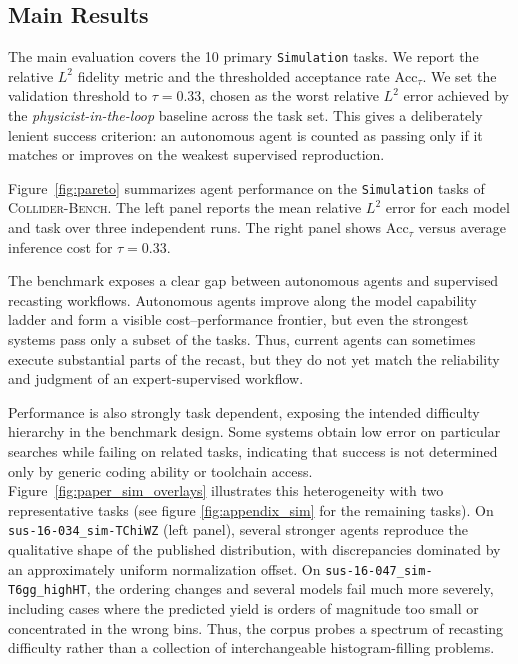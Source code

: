 \documentclass{article}
\newcommand{\ColliderBench}{\textsc{Collider-Bench}}
\begin{document}
\subsection{Main Results}
\label{sec:main-results}
The main evaluation covers the 10 primary \texttt{Simulation} tasks. We report the relative \(L^2\) fidelity metric and the thresholded acceptance rate \(\mathrm{Acc}_{\tau}\).%
We set the validation threshold to \(\tau=0.33\), chosen as the worst relative \(L^2\) error achieved by the {\it physicist-in-the-loop} baseline across the task set. This gives a deliberately lenient success criterion: an autonomous agent is counted as passing only if it matches or improves on the weakest supervised reproduction.

Figure~\ref{fig:pareto} summarizes agent performance on the \texttt{Simulation} tasks of \ColliderBench{}. The left panel reports the mean relative \(L^2\) error for each model and task over three independent runs. The right panel shows \(\mathrm{Acc}_{\tau}\) versus average inference cost for \(\tau=0.33\).

The benchmark exposes a clear gap between autonomous agents and supervised recasting workflows. Autonomous agents improve along the model capability ladder and form a visible cost--performance frontier, but even the strongest systems pass only a subset of the tasks. Thus, current agents can sometimes execute substantial parts of the recast, but they do not yet match the reliability and judgment of an expert-supervised workflow.

Performance is also strongly task dependent, exposing the intended difficulty hierarchy in the benchmark design. Some systems obtain low error on particular searches while failing on related tasks, indicating that success is not determined only by generic coding ability or toolchain access. Figure~\ref{fig:paper_sim_overlays} illustrates this heterogeneity with two representative tasks (see figure \ref{fig:appendix_sim} for the remaining tasks). On \texttt{sus-16-034\_sim-TChiWZ} (left panel), several stronger agents reproduce the qualitative shape of the published distribution, with discrepancies dominated by an approximately uniform normalization offset. On \texttt{sus-16-047\_sim-T6gg\_highHT}, the ordering changes and several models fail much more severely, including cases where the predicted yield is orders of magnitude too small or concentrated in the wrong bins. Thus, the corpus probes a spectrum of recasting difficulty rather than a collection of interchangeable histogram-filling problems.
\end{document}
